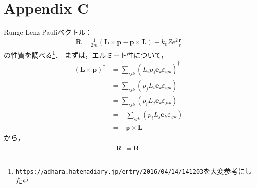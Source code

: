 \chapter{Appendix C}
Runge-Lenz-Pauliベクトル：
\begin{align}
  \boldsymbol{R}=\frac{1}{2m}(\boldsymbol{L}\times\boldsymbol{p} - \boldsymbol{p}\times\boldsymbol{L}) + k_0Ze^2\frac{\boldsymbol{r}}{r}
\end{align}
の性質を調べる\footnote{\verb|https://adhara.hatenadiary.jp/entry/2016/04/14/141203|を大変参考にした}．
まずは，エルミート性について，
\begin{align*}
  (\boldsymbol{L}\times\boldsymbol{p})^\dagger
  & = \sum_{ijk}(L_ip_j\boldsymbol{e}_k\varepsilon_{ijk})^\dagger\\
  & = \sum_{ijk}(p_jL_i\boldsymbol{e}_k\varepsilon_{ijk})\\
  & = \sum_{ijk}(p_iL_j\boldsymbol{e}_k\varepsilon_{jik})\\
  & = - \sum_{ijk}(p_iL_j\boldsymbol{e}_k\varepsilon_{ijk})\\
  & = - \boldsymbol{p}\times\boldsymbol{L}
\end{align*}
から，
\begin{align}
  \boldsymbol{R}^\dagger=\boldsymbol{R}.
\end{align}

